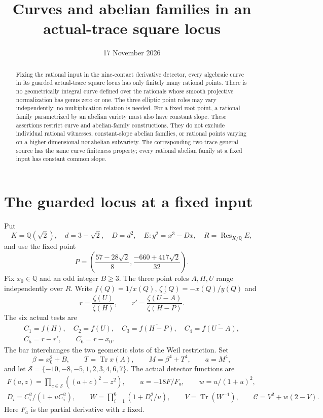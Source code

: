 \documentclass[11pt,a4paper]{article}
\title{Curves and abelian families in an actual-trace square locus}
\author{}\date{17 November 2026}
\newcommand{\Q}{\mathbb Q}\newcommand{\Z}{\mathbb Z}
\DeclareMathOperator{\Res}{Res}\DeclareMathOperator{\Tr}{Tr}
\begin{document}
\maketitle
\begin{abstract}
Fixing the rational input in the nine-contact derivative detector,
every algebraic curve in its guarded actual-trace square locus has
only finitely many rational points. There is no geometrically integral
curve defined over the rationals whose smooth projective normalization
has genus zero or one. The three elliptic point roles may vary
independently; no multiplication relation is needed. For a fixed root
point, a rational family parametrized by an abelian variety must also
have constant slope. These assertions restrict curve and abelian-family
constructions. They do not exclude individual rational witnesses,
constant-slope abelian families, or rational points varying on a
higher-dimensional nonabelian subvariety. The corresponding two-trace
general source has the same curve finiteness property; every rational
abelian family at a fixed input has constant common slope.
\end{abstract}

\section{The guarded locus at a fixed input}

Put
\[
 K=\Q(\sqrt2),\quad d=3-\sqrt2,\quad D=d^2,\quad
 E:y^2=x^3-Dx,\quad R=\Res_{K/\Q}E,
\]
and use the fixed point
\[
 P=\left(\frac{57-28\sqrt2}{8},
          \frac{-660+417\sqrt2}{32}\right).
\]
Fix $x_0\in\Q$ and an odd integer $B\ge3$. The three point roles
$A,H,U$ range independently over $R$. Write $f(Q)=1/x(Q)$,
$\zeta(Q)=-x(Q)/y(Q)$ and
\[
 r=\frac{\zeta(U)}{\zeta(H)},\qquad
 r'=\overline{\frac{\zeta(U-A)}{\zeta(H-P)}}.
\]
The six actual tests are
\[
 \begin{gathered}
 C_1=f(H),\quad C_2=f(U),\quad
 C_3=\overline{f(H-P)},\quad C_4=\overline{f(U-A)},\\
 C_5=r-r',\qquad C_6=r-x_0.
 \end{gathered}
\]
The bar interchanges the two geometric slots of the Weil restriction.
Set
\begin{equation}\label{eq:scale}
 \beta=x_0^2+B,\qquad T=\Tr x(A),\qquad
 M=\beta^4+T^4,\qquad a=M^4,
\end{equation}
and let $\mathcal S=\{-10,-8,-5,1,2,3,4,6,7\}$. The actual
detector functions are
\begin{equation}\label{eq:detector}
 \begin{gathered}
 F(a,z)=\prod_{c\in\mathcal S}((a+c)^2-z^2),\qquad
 u=-18F/F_a,\qquad w=u/(1+u)^2,\\
 D_i=C_i^2/(1+uC_i^2),\qquad
 W=\prod_{i=1}^6(1+D_i^2/u),\qquad
 V=\Tr(W^{-1}),\qquad \mathcal C=V^2+w(2-V).
 \end{gathered}
\end{equation}
Here $F_a$ is the partial derivative with $z$ fixed.
\end{document}
